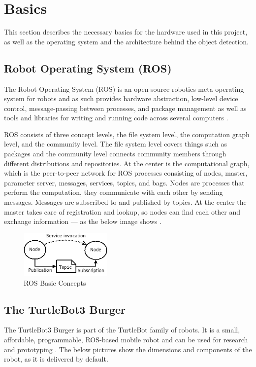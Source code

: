 \section{Basics}

This section describes the necessary basics for the hardware used in this project, as well as the operating system and the architecture behind the object detection.

\subsection{Robot Operating System (ROS)}
The Robot Operating System (ROS) is an open-source robotics meta-operating system for robots and as such provides hardware abstraction, low-level device control, message-passing between processes, and package management as well as tools and libraries for writing and running code across several computers \autocite{ros-intro}.

ROS consists of three concept levels, the file system level, the computation graph level, and the community level. The file system level covers things such as packages and the community level connects community members through different distributions and repositories. At the center is the computational graph, which is the peer-to-peer network for ROS processes consisting of nodes, master, parameter server, messages, services, topics, and bags. Nodes are processes that perform the computation, they communicate with each other by sending messages. Messages are subscribed to and published by topics. At the center the master takes care of registration and lookup, so nodes can find each other and exchange information --- as the below image shows \autocite{ros-concepts}.

\begin{figure}[!ht]
\centering
\includegraphics[width=4.5cm]{images/basics/ROS_basic_concepts.png}
\caption{ROS Basic Concepts \autocite{ros-concepts}}
\label{fig:ros-basic-concepts}
\end{figure}

\subsection{The TurtleBot3 Burger}
The TurtleBot3 Burger is part of the TurtleBot family of robots. It is a small, affordable, programmable, ROS-based mobile robot and can be used for research and prototyping \autocite{emanual-turtlebot3-ov}. The below pictures show the dimensions and components of the robot, as it is delivered by default.

